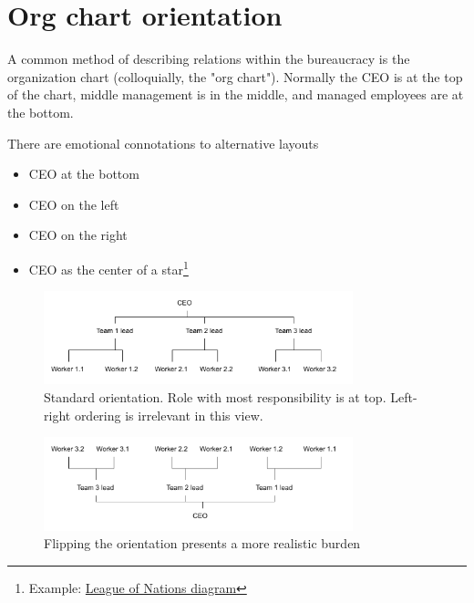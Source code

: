 \section{Org chart orientation
\label{org-chart-orientation}}
A common method of describing relations within the bureaucracy is the organization chart (colloquially, the "org chart"). Normally the CEO is at the top of the chart, middle management is in the middle, and managed employees are at the bottom. 

There are emotional connotations to alternative layouts
\begin{itemize}
\item CEO at the bottom
\item CEO on the left
\item CEO on the right
\item CEO as the center of a star\footnote{Example: \href{https://en.wikipedia.org/wiki/File:League_of_Nations_Organization.png}{League of Nations diagram}}
\end{itemize}


\begin{figure}
\includegraphics[width=0.8\textwidth]{images/org-chart-orientation-ceo-at-top.pdf}
\caption{Standard orientation. Role with most responsibility is at top. Left-right ordering is irrelevant in this view.}
\end{figure}

\begin{figure}
\includegraphics[width=0.8\textwidth]{images/org-chart-orientation-ceo-at-bottom.pdf}
\caption{Flipping the orientation presents a more realistic burden}
\end{figure}

